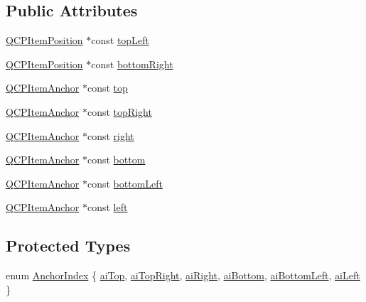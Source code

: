 \subsection*{Public Attributes}
\begin{DoxyCompactItemize}
\item 
\mbox{\hyperlink{class_q_c_p_item_position}{Q\+C\+P\+Item\+Position}} $\ast$const \mbox{\hyperlink{class_q_c_p_item_rect_aa70feeef173489b03c3fbe906a5023c4}{top\+Left}}
\item 
\mbox{\hyperlink{class_q_c_p_item_position}{Q\+C\+P\+Item\+Position}} $\ast$const \mbox{\hyperlink{class_q_c_p_item_rect_a409f3bfe615a7e322bb3d4d193d85b26}{bottom\+Right}}
\item 
\mbox{\hyperlink{class_q_c_p_item_anchor}{Q\+C\+P\+Item\+Anchor}} $\ast$const \mbox{\hyperlink{class_q_c_p_item_rect_a96e50db552fb297d6fb62614676217bc}{top}}
\item 
\mbox{\hyperlink{class_q_c_p_item_anchor}{Q\+C\+P\+Item\+Anchor}} $\ast$const \mbox{\hyperlink{class_q_c_p_item_rect_a77e0eb6e4aa6efee620d35e2c21bdad7}{top\+Right}}
\item 
\mbox{\hyperlink{class_q_c_p_item_anchor}{Q\+C\+P\+Item\+Anchor}} $\ast$const \mbox{\hyperlink{class_q_c_p_item_rect_a7979c1915f61ad2609a9cc179c2e445e}{right}}
\item 
\mbox{\hyperlink{class_q_c_p_item_anchor}{Q\+C\+P\+Item\+Anchor}} $\ast$const \mbox{\hyperlink{class_q_c_p_item_rect_a99313bf2b338d9f81e19bd38082038aa}{bottom}}
\item 
\mbox{\hyperlink{class_q_c_p_item_anchor}{Q\+C\+P\+Item\+Anchor}} $\ast$const \mbox{\hyperlink{class_q_c_p_item_rect_abd8ee63fdf81f0c74bf7ccadee8603da}{bottom\+Left}}
\item 
\mbox{\hyperlink{class_q_c_p_item_anchor}{Q\+C\+P\+Item\+Anchor}} $\ast$const \mbox{\hyperlink{class_q_c_p_item_rect_aad0ca1af0c8debfc20d7b47fc942764d}{left}}
\end{DoxyCompactItemize}
\subsection*{Protected Types}
\begin{DoxyCompactItemize}
\item 
enum \mbox{\hyperlink{class_q_c_p_item_rect_af0ebba58e6bca4851c4db726691ec0d3}{Anchor\+Index}} \{ \newline
\mbox{\hyperlink{class_q_c_p_item_rect_af0ebba58e6bca4851c4db726691ec0d3acaef33243034885d551dc9b8318ad326}{ai\+Top}}, 
\mbox{\hyperlink{class_q_c_p_item_rect_af0ebba58e6bca4851c4db726691ec0d3aa94843ce5935b36994005c1e1859ef60}{ai\+Top\+Right}}, 
\mbox{\hyperlink{class_q_c_p_item_rect_af0ebba58e6bca4851c4db726691ec0d3a69fa21fde2f44036381296a6f78b4eb4}{ai\+Right}}, 
\mbox{\hyperlink{class_q_c_p_item_rect_af0ebba58e6bca4851c4db726691ec0d3a2d294551e07179c4ac0c4e37364a1468}{ai\+Bottom}}, 
\newline
\mbox{\hyperlink{class_q_c_p_item_rect_af0ebba58e6bca4851c4db726691ec0d3ab3c42dbb1709a04ba9b03dcbf5a2537a}{ai\+Bottom\+Left}}, 
\mbox{\hyperlink{class_q_c_p_item_rect_af0ebba58e6bca4851c4db726691ec0d3a8a095c6d6b2e7665a15d9f40c94b47dc}{ai\+Left}}
 \}
\end{DoxyCompactItemize}
